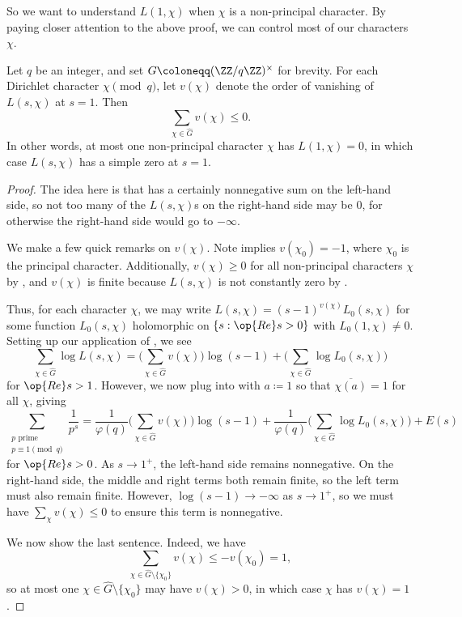 \documentclass[../notes.tex]{subfiles}
\begin{document}
So we want to understand $L(1,\chi)$ when $\chi$ is a non-principal character. By paying closer attention to the above proof, we can control most of our characters $\chi$.
\begin{lemma} \label{lem:at-most-bad-chi}
	Let $q$ be an integer, and set $G\coloneqq(\ZZ/q\ZZ)^\times$ for brevity. For each Dirichlet character $\chi\pmod q$, let $v(\chi)$ denote the order of vanishing of $L(s,\chi)$ at $s=1$. Then
	\[\sum_{\chi\in\widehat G}v(\chi)\le0.\]
	In other words, at most one non-principal character $\chi$ has $L(1,\chi)=0$, in which case $L(s,\chi)$ has a simple zero at $s=1$.
\end{lemma}
\begin{proof}
	The idea here is that  has a certainly nonnegative sum on the left-hand side, so not too many of the $L(s,\chi)$s on the right-hand side may be $0$, for otherwise the right-hand side would go to $-\infty$.

	We make a few quick remarks on $v(\chi)$. Note  implies $v(\chi_0)=-1$, where $\chi_0$ is the principal character. Additionally, $v(\chi)\ge0$ for all non-principal characters $\chi$ by , and $v(\chi)$ is finite because $L(s,\chi)$ is not constantly zero by .

	Thus, for each character $\chi$, we may write $L(s,\chi)=(s-1)^{v(\chi)}L_0(s,\chi)$ for some function $L_0(s,\chi)$ holomorphic on $\{s:\op{Re}s>0\}$ with $L_0(1,\chi)\ne0$. Setting up our application of , we see
	\[\sum_{\chi\in\widehat G}\log L(s,\chi)=\Bigg(\sum_{\chi\in\widehat G}v(\chi)\Bigg)\log(s-1)+\Bigg(\sum_{\chi\in\widehat G}\log L_0(s,\chi)\Bigg)\]
	for $\op{Re}s>1$. However, we now plug into  with $a\coloneqq1$ so that $\overline{\chi(a)}=1$ for all $\chi$, giving
	\[\sum_{\substack{p\text{ prime}\\p\equiv1\pmod q}}\frac1{p^s}=\frac1{\varphi(q)}\Bigg(\sum_{\chi\in\widehat G}v(\chi)\Bigg)\log(s-1)+\frac1{\varphi(q)}\Bigg(\sum_{\chi\in\widehat G}\log L_0(s,\chi)\Bigg)+E(s)\]
	for $\op{Re}s>0$. As $s\to1^+$, the left-hand side remains nonnegative. On the right-hand side, the middle and right terms both remain finite, so the left term must also remain finite. However, $\log(s-1)\to-\infty$ as $s\to1^+$, so we must have $\sum_\chi v(\chi)\le0$ to ensure this term is nonnegative.

	We now show the last sentence. Indeed, we have
	\[\sum_{\chi\in\widehat G\setminus\{\chi_0\}}v(\chi)\le-v(\chi_0)=1,\]
	so at most one $\chi\in\widehat G\setminus\{\chi_0\}$ may have $v(\chi)>0$, in which case $\chi$ has $v(\chi)=1$.
\end{proof}
\end{document}
